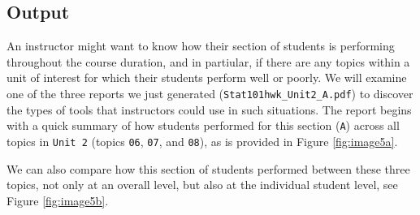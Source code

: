 \documentclass[11pt,a4paper,oldfontcommands,openany]{memoir}
\numberwithin{equation}{section} %
\begin{document}
\subsection{Output}

An instructor might want to know how their section of students is performing throughout the course duration, and in partiular, if there are any topics within a unit of interest for which their students perform well or poorly. We will examine one of the three reports we just generated (\texttt{Stat101hwk\_Unit2\_A.pdf}) to discover the types of tools that instructors could use in such situations. The report begins with a quick summary of how students performed for this section (\texttt{A}) across all topics in \texttt{Unit 2} (topics \texttt{06}, \texttt{07}, and \texttt{08}), as is provided in Figure \ref{fig:image5a}.

\begin{center}
\captionsetup{width=0.65\textwidth}
\label{fig:image5a}
\end{center}

We can also compare how this section of students performed between these three topics, not only at an overall level, but also at the individual student level, see Figure \ref{fig:image5b}.
\end{document}

